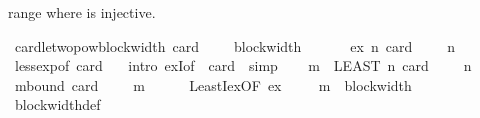 \begin{isabellebody}
\begin{isamarkuptext}
  range where  is injective.%
\end{isamarkuptext}\isamarkuptrue%
\isamarkupfalse%
\ card{\isacharunderscore}{\kern0pt}le{\isacharunderscore}{\kern0pt}two{\isacharunderscore}{\kern0pt}pow{\isacharunderscore}{\kern0pt}block{\isacharunderscore}{\kern0pt}width{\isacharcolon}{\kern0pt}\ {\isachardoublequoteopen}card\ {\isasymGamma}\ {\isasymle}\ {}\ {\isacharcircum}{\kern0pt}\ block{\isacharunderscore}{\kern0pt}width\ {\isasymGamma}{\isachardoublequoteclose}\isanewline
%
\isadelimproof
%
\endisadelimproof
%
\isatagproof
{}\isamarkupfalse%
\ {\isacharminus}{\kern0pt}\isanewline
\ \ \isamarkupfalse%
\ ex{\isacharcolon}{\kern0pt}\ {\isachardoublequoteopen}{\isasymexists}n{\isachardot}{\kern0pt}\ card\ {\isasymGamma}\ {\isasymle}\ {}\ {\isacharcircum}{\kern0pt}\ n{\isachardoublequoteclose}\isanewline
\ \ \ \ \isamarkupfalse%
\ less{\isacharunderscore}{\kern0pt}exp{\isacharbrackleft}{\kern0pt}of\ {\isachardoublequoteopen}card\ {\isasymGamma}{\isachardoublequoteclose}{\isacharbrackright}{\kern0pt}\ \isamarkupfalse%
\ {\isacharparenleft}{\kern0pt}intro\ exI{\isacharbrackleft}{\kern0pt}of\ {\isacharunderscore}{\kern0pt}\ {\isachardoublequoteopen}card\ {\isasymGamma}{\isachardoublequoteclose}{\isacharbrackright}{\kern0pt}{\isacharparenright}{\kern0pt}\ simp\isanewline
\ \ \isamarkupfalse%
\ {\isacharquery}{\kern0pt}m\ {\isacharequal}{\kern0pt}\ {\isachardoublequoteopen}LEAST\ n{\isachardot}{\kern0pt}\ card\ {\isasymGamma}\ {\isasymle}\ {}\ {\isacharcircum}{\kern0pt}\ n{\isachardoublequoteclose}\isanewline
\ \ \isamarkupfalse%
\ m{\isacharunderscore}{\kern0pt}bound{\isacharcolon}{\kern0pt}\ {\isachardoublequoteopen}card\ {\isasymGamma}\ {\isasymle}\ {}\ {\isacharcircum}{\kern0pt}\ {\isacharquery}{\kern0pt}m{\isachardoublequoteclose}\isanewline
\ \ \ \ \isamarkupfalse%
\ LeastI{\isacharunderscore}{\kern0pt}ex{\isacharbrackleft}{\kern0pt}OF\ ex{\isacharbrackright}{\kern0pt}\ \isakeywordONE{{\isachardot}{\kern0pt}}\isamarkupfalse%
\isanewline
\ \ \isamarkupfalse%
\ {\isachardoublequoteopen}{\isacharquery}{\kern0pt}m\ {\isasymle}\ block{\isacharunderscore}{\kern0pt}width\ {\isasymGamma}{\isachardoublequoteclose}\isanewline
\ \ \ \ \isamarkupfalse%
\ block{\isacharunderscore}{\kern0pt}width{\isacharunderscore}{\kern0pt}def\ \isamarkupfalse%

\end{isabellebody}
